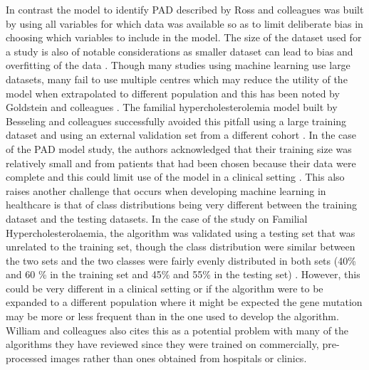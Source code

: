 In contrast the model to identify PAD described by Ross and colleagues \citep{Ross:2016kh} was built by using all variables for which data was available so as to limit deliberate bias in choosing which variables to include in the model.\newline
The size of the dataset used for a study is also of notable considerations as smaller dataset can lead to bias and overfitting  of the data \citep{Steyerberg:2003fq}. Though many studies using machine learning use large datasets, many fail to use multiple centres which may reduce the utility of the model when extrapolated to different population and this has been noted by Goldstein and colleagues \citep{Goldstein:2017bk}. The familial hypercholesterolemia model built by Besseling and colleagues successfully avoided this pitfall using a large training dataset and using an external validation set from a different cohort \citep{Besseling:2017bs}. In the case of the PAD model study, the authors acknowledged that their training size was relatively small and from patients that had been chosen because their data were complete and this could limit use of the model in a clinical setting \citep{Ross:2016kh}.\newline
This also raises another challenge that occurs when developing machine learning in healthcare is that of class distributions being very different between the training dataset and the testing datasets. In the case of the study on Familial Hypercholesterolaemia, the algorithm was validated using a testing set that was unrelated to the training set, though the class distribution were similar between the two sets and the two classes were fairly evenly distributed in both sets (40\% and 60 \% in the training set and 45\% and 55\% in the testing set) \citep{Besseling:2017bs}. However, this could be very different in a clinical setting or if the algorithm were to be expanded to a different population where it might be expected the gene mutation may be more or less frequent than in the one used to develop the algorithm. William and colleagues also cites this as a potential problem with many of the algorithms they have reviewed \citep{William:2018ia} since they were trained on commercially, pre-processed images rather than ones obtained from hospitals or clinics.


